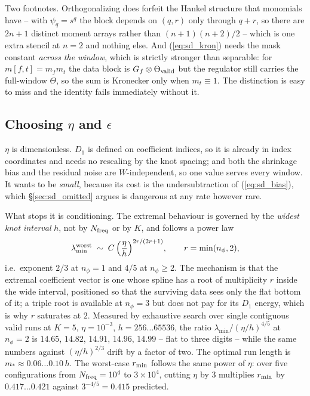 \documentclass{article}
\numberwithin{equation}{section}   %
\begin{document}
Two footnotes.  Orthogonalizing does forfeit the Hankel structure that monomials have -- with $\psi_q = s^q$
the block depends on $(q,r)$ only through $q+r$, so there are $2n+1$ distinct moment arrays rather than
$(n+1)(n+2)/2$ -- which is one extra stencil at $n=2$ and nothing else.  And (\ref{eq:sd_kron}) needs the mask
constant {\em across the window}, which is strictly stronger than separable: for $m[f,t] = m_f m_t$ the data
block is $G_f \otimes \Theta_{\rm valid}$ but the regulator still carries the full-window $\Theta$, so the sum
is Kronecker only when $m_t \equiv 1$.  The distinction is easy to miss and the identity fails immediately
without it.

\subsection{Choosing $\eta$ and $\epsilon$}
\label{sec:sd_eta_eps}

$\eta$ is dimensionless.  $D_1$ is defined on coefficient indices, so it is already in index coordinates and
needs no rescaling by the knot spacing; and both the shrinkage bias and the residual noise are $W$-independent,
so one value serves every window.  It wants to be {\em small}, because its cost is the undersubtraction of
(\ref{eq:sd_bias}), which \S\ref{sec:sd_omitted} argues is dangerous at any rate however rare.

What stops it is conditioning.  The extremal behaviour is governed by the {\em widest knot interval} $h$, not
by $N_{\rm freq}$ or by $K$, and follows a power law
\begin{equation}
\lambda_{\min}^{\rm worst} \;\sim\; C\,\Big(\frac{\eta}{h}\Big)^{2r/(2r+1)},
\qquad r = \min(n_\phi, 2) ,
\label{eq:sd_law}
\end{equation}
i.e.~exponent $2/3$ at $n_\phi = 1$ and $4/5$ at $n_\phi \ge 2$.  The mechanism is that the extremal
coefficient vector is one whose spline has a root of multiplicity $r$ inside the wide interval, positioned so
that the surviving data sees only the flat bottom of it; a triple root is available at $n_\phi = 3$ but does
not pay for its $D_1$ energy, which is why $r$ saturates at $2$.  Measured by exhaustive search over single
contiguous valid runs at $K = 5$, $\eta = 10^{-3}$, $h = 256 \ldots 65536$, the ratio
$\lambda_{\min}/(\eta/h)^{4/5}$ at $n_\phi = 2$ is $14.65$, $14.82$, $14.91$, $14.96$, $14.99$ -- flat to three
digits -- while the same numbers against $(\eta/h)^{2/3}$ drift by a factor of two.  The optimal run length is
$m_* \approx 0.06 \ldots 0.10\,h$.  The worst-case $r_{\rm min}$ follows the same power of $\eta$: over five
configurations from $N_{\rm freq} = 10^4$ to $3\times10^4$, cutting $\eta$ by $3$ multiplies $r_{\rm min}$ by
$0.417 \ldots 0.421$ against $3^{-4/5} = 0.415$ predicted.
\end{document}
